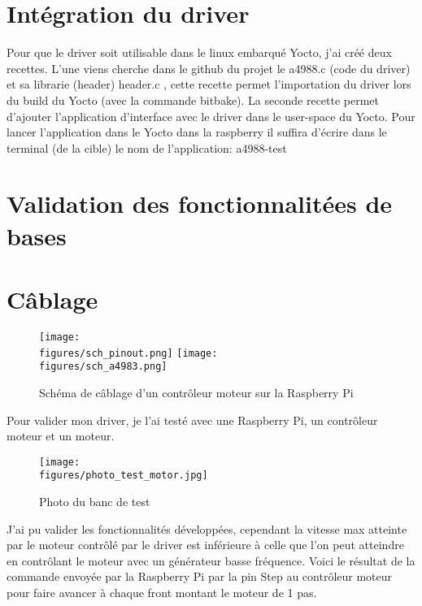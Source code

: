 \section{Intégration du driver}
Pour que le driver soit utilisable dans le linux embarqué Yocto, j'ai créé deux recettes. L'une viens cherche dans le github du projet le a4988.c (code du driver) et sa librarie (header) header.c , cette recette permet l'importation du driver lors du build du Yocto (avec la commande bitbake). \newline La seconde recette permet d'ajouter l'application d'interface avec le driver dans le user-space du Yocto. Pour lancer l'application dans le Yocto dans la raspberry il suffira d'écrire dans le terminal (de la cible) le nom de l'application: a4988-test \newline 

\section{Validation des fonctionnalitées de bases}

\section{Câblage}
\begin{figure}[H]
    \centering
    \texttt{[image: \\figures/sch\_pinout.png]}
    \texttt{[image: \\figures/sch\_a4983.png]}
    \decoRule
    \caption[
    Schéma de câblage d'un contrôleur moteur sur la Raspberry Pi]{
    Schéma de câblage d'un contrôleur moteur sur la Raspberry Pi}
    \label{fig:Schéma de câblage d'un contrôleur moteur sur la Raspberry Pi}
    \end{figure}

\vspace{1cm}

Pour valider mon driver, je l’ai testé avec une Raspberry Pi, un contrôleur moteur et un moteur.

\begin{figure}[H]
    \centering
    \texttt{[image: \\figures/photo\_test\_motor.jpg]}
    \decoRule
    \caption[
    Photo du banc de test]{
	Photo du banc de test}
    \label{fig:Photo du banc de test}
    \end{figure}

\vspace{1cm}

J’ai pu valider les fonctionnalités développées, cependant la vitesse max atteinte par le moteur contrôlé par le driver est inférieure à celle que l'on peut atteindre en contrôlant le moteur avec un générateur basse fréquence.
Voici le résultat de la commande envoyée par la Raspberry Pi par la pin Step au contrôleur moteur pour faire avancer à chaque front montant le moteur de 1 pas.

